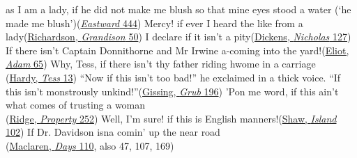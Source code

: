 \ea \label{ex:04-81}
\ea
as I am a lady, if he did not make me blush so that mine eyes stood a water \phantom{x} (`he made me blush')\hfill(\href{https://archive.org/details/representativee02unkngoog/page/444/mode/2up?q=\%22as+i+am+a+lady%2C+if\%22&view=theater}{\textit{Eastward} 444})
\ex
Mercy! if ever I heard the like from a lady\hfill(\href{https://archive.org/details/bim_eighteenth-century_sir-charles-grandison-_richardson-samuel_1780_1/page/52/mode/2up?q=\%22Mercy%21+if+ever+I+heard+the+like+from+a+lady\%22&view=theater}{Richardson, \textit{Grandison} 50})
\ex
I declare if it isn't a pity\hfill(\href{https://archive.org/details/lifeadventuresofdickrich/page/140/mode/2up?q=\%22declare+if+it+isn%27t+a+pity\%22&view=theater}{Dickens, \textit{Nicholas} 127})
\ex
If there isn't Captain Donnithorne and Mr Irwine a-coming into the yard!\hfill(\href{https://archive.org/details/adambede01eli/page/142/mode/2up?q=\%22If+there+isn%E2%80%99t+Captain+Donnithorne\%22&view=theater}{Eliot, \textit{Adam} 65}) %
\ex
Why, Tess, if there isn't thy father riding hwome in a carriage\\\hfill(\href{https://archive.org/details/in.ernet.dli.2015.350984/page/n25/mode/2up?q=\%22Why%2C+Tess+Durbeyfield\%22&view=theater}{Hardy, \textit{Tess} 13}) %
\ex
``Now if this isn't too bad!'' he exclaimed in a thick voice. ``If this isn't monstrously unkind!''\hfill(\href{https://archive.org/details/newgrubstreetnov02gissuoft/page/96/mode/2up?q=\%22%E2%80%98Now+if+this+isn%E2%80%99t+too+bad%21%E2%80%99\%22&view=theater}{Gissing, \textit{Grub} 196})
\ex
'Pon me word, if this ain't what comes of trusting a woman\\\hfill(\href{https://archive.org/details/lostpropertystor00ridgrich/page/106/mode/2up?q=\%22%27pon+me+word\%22&view=theater}{Ridge, \textit{Property} 252})
\ex
Well, I'm sure! if this is English manners!\hfill(\href{https://archive.org/details/johnbullsotheris0000shaw/page/102/mode/2up?q=\%22Well%2C+I%E2%80%99m+sure%21+if+this+is+English+manners%21\%22&view=theater}{Shaw, \textit{Island} 102})
\ex
If Dr. Davidson isna comin' up the near road\\\hfill(\href{https://archive.org/details/daysofauldlangsy0000ianm/page/112/mode/2up?q=\%22If+Doctor+Davidson+isna+comin%E2%80%99+up+the+near+road%21\%22&view=theater}{Maclaren, \textit{Days} 110}, also 47, 107, 169) %
